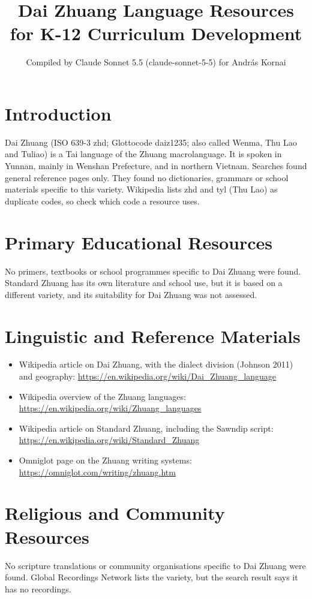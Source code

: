 \documentclass[12pt]{article}
\title{Dai Zhuang Language Resources for K-12 Curriculum Development}
\author{Compiled by Claude Sonnet 5.5 (claude-sonnet-5-5) for Andr\'as Kornai}
\date{}
\begin{document}
\maketitle

\section{Introduction}
Dai Zhuang (ISO 639-3 zhd; Glottocode daiz1235; also called Wenma, Thu Lao and Tuliao) is a Tai language of the Zhuang macrolanguage. It is spoken in Yunnan, mainly in Wenshan Prefecture, and in northern Vietnam. Searches found general reference pages only. They found no dictionaries, grammars or school materials specific to this variety. Wikipedia lists zhd and tyl (Thu Lao) as duplicate codes, so check which code a resource uses.

\section{Primary Educational Resources}
No primers, textbooks or school programmes specific to Dai Zhuang were found. Standard Zhuang has its own literature and school use, but it is based on a different variety, and its suitability for Dai Zhuang was not assessed.

\section{Linguistic and Reference Materials}
\begin{itemize}
\item Wikipedia article on Dai Zhuang, with the dialect division (Johnson 2011) and geography: \url{https://en.wikipedia.org/wiki/Dai_Zhuang_language}
\item Wikipedia overview of the Zhuang languages: \url{https://en.wikipedia.org/wiki/Zhuang_languages}
\item Wikipedia article on Standard Zhuang, including the Sawndip script: \url{https://en.wikipedia.org/wiki/Standard_Zhuang}
\item Omniglot page on the Zhuang writing systems: \url{https://omniglot.com/writing/zhuang.htm}
\end{itemize}

\section{Religious and Community Resources}
No scripture translations or community organisations specific to Dai Zhuang were found. Global Recordings Network lists the variety, but the search result says it has no recordings.
\end{document}
